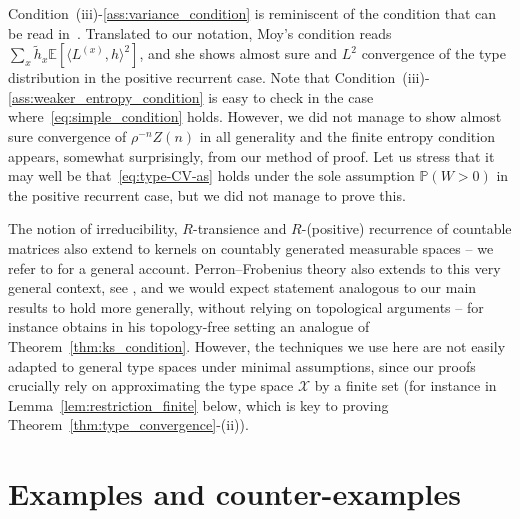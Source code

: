 \begin{refsegment}
\begin{rem}\label{rmq:moy}
  Condition~(iii)-\ref{ass:variance_condition} is reminiscent of the
  condition that can be read
  in~\citet[Theorem~1]{moy_extensions_1967}. Translated to our
  notation, Moy's condition reads
  $\sum_x \tilde{h}_x \mathbb{E}[\langle L^{(x)},h\rangle^2]$, and she
  shows almost sure and $L^2$ convergence of the type distribution in
  the positive recurrent case. Note that
  Condition~(iii)-\ref{ass:weaker_entropy_condition} is easy to check
  in the case where~\eqref{eq:simple_condition} holds. However, we did
  not manage to show almost sure convergence of $\rho^{-n}Z(n)$ in all
  generality and the finite entropy condition appears, somewhat
  surprisingly, from our method of proof. Let us stress that it
    may well be that~\eqref{eq:type-CV-as} holds under the sole
    assumption $\mathbb{P}(W>0)$ in the positive recurrent case, but
    we did not manage to prove this.
\end{rem}

\begin{rem}\label{rmq:nummelin-tweedie}
  The notion of irreducibility, $R$-transience and $R$-(positive) recurrence of countable matrices also extend to kernels on countably generated measurable spaces -- we refer to \citet{Num84} for a general account.
  Perron--Frobenius theory also extends to this very general context, see \cite{Twe74}, and we would expect statement analogous to our
  main results to hold more generally, without relying on topological
  arguments -- for instance \cite{athreya_change_2000} obtains in
  his topology-free setting an analogue of Theorem~\ref{thm:ks_condition}.
  However, the techniques we use here are not easily adapted to general type spaces under minimal assumptions, since our proofs crucially rely on approximating the type space $\mathcal{X}$ by a finite set (for instance in Lemma~\ref{lem:restriction_finite} below, which is key to proving Theorem~\ref{thm:type_convergence}-(ii)).
\end{rem}

\section{Examples and counter-examples}\label{ch2_sec:examples}


\end{refsegment}
